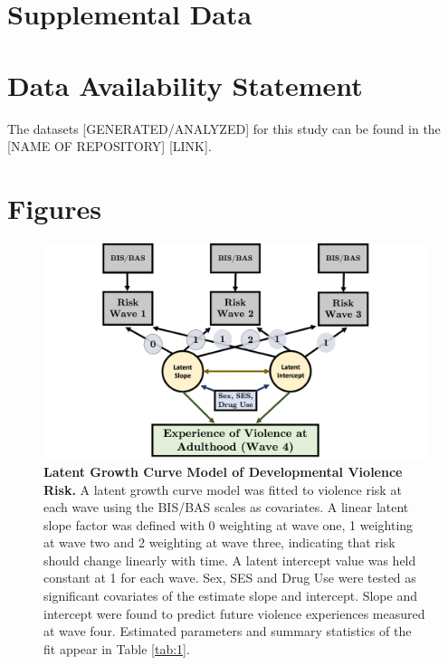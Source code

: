\documentclass[utf8]{article}
\begin{document}
\section*{Supplemental Data}

\section*{Data Availability Statement}
The datasets [GENERATED/ANALYZED] for this study can be found in the [NAME OF REPOSITORY] [LINK].
\clearpage
\section*{Figures}
\begin{figure}[h!]
\includegraphics[width=\textwidth,height=\textheight,keepaspectratio]{Fig-1}
\caption{\textbf{Latent Growth Curve Model of Developmental Violence Risk.} A latent growth curve model was fitted to violence risk at each wave using the BIS/BAS scales as covariates. A linear latent slope factor was defined with 0 weighting at wave one, 1 weighting at wave two and 2 weighting at wave three, indicating that risk should change linearly with time. A latent intercept value was held constant at 1 for each wave. Sex, SES and Drug Use were tested as significant covariates of the estimate slope and intercept. Slope and intercept were found to predict future violence experiences measured at wave four. Estimated parameters and summary statistics of the fit appear in Table \ref{tab:1}. \label{fig:1}}
\end{figure}
%
\end{document}
